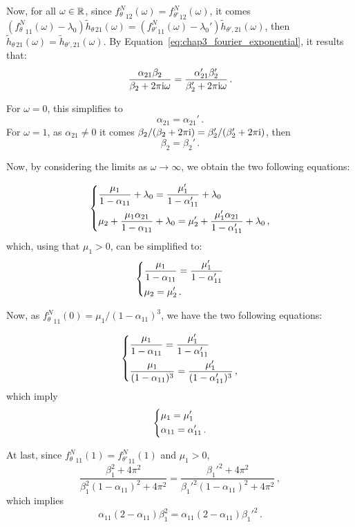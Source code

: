 \begin{subappendices}
Now, for all $\omega \in {\mathbb R}$, since ${f_\theta^N}_{12}(\omega) = {f_{\theta'}^N}_{12}(\omega)$, it comes $({f_\theta^N}_{11}(\omega) - \lambda_0)\tilde h_{\theta \, 21}(\omega) = ({f_{\theta'}^N}_{11}(\omega) - \lambda_0')\tilde h_{\theta', 21}(\omega)$, then $\tilde h_{\theta \, 21}(\omega) = \tilde h_{\theta', 21}(\omega)$.
By Equation~\eqref{eq:chap3_fourier_exponential}, it results that: 
\[
\frac{\alpha_{21} \beta_2}{\beta_2 + 2 \pi \mathrm{i} \omega} = \frac{\alpha_{21}' \beta_2'}{\beta_2' + 2 \pi \mathrm{i} \omega}\,.
\]

For $\omega = 0$, this simplifies to \[\alpha_{21} = \alpha_{21}'\,.\]
For $\omega = 1$, as $\alpha_{21} \neq 0$ it comes
${\beta_2}/(\beta_2 + 2 \pi \mathrm{i}) = {\beta_2'}/(\beta_2' + 2 \pi \mathrm{i})$, then
\[
\beta_2 = \beta_2' \,.
\]

Now, by considering the limits as $\omega \to \infty$, we obtain the two following equations:

\[\begin{dcases}
\frac{\mu_1}{1-\alpha_{11}} + \lambda_0 = \frac{\mu_1'}{1-\alpha_{11}'} + \lambda_0\\
\mu_2 + \frac{\mu_1 \alpha_{21}}{1-\alpha_{11}} + \lambda_0 = \mu_2' + \frac{\mu_1' \alpha_{21}}{1-\alpha_{11}'} + \lambda_0\,,
\end{dcases}
\]
which, using that $\mu_1 > 0$, can be simplified to:
\[
\begin{dcases}
\frac{\mu_1}{1-\alpha_{11}}= \frac{\mu_1'}{1-\alpha_{11}'}\\
\mu_2 = \mu_2'\,. 
\end{dcases}
\]

Now, as ${f_\theta^N}_{11}(0) = {\mu_1}/{(1-\alpha_{11})^3}$, we have the two following equations:

\[\begin{dcases}
\frac{\mu_1}{1-\alpha_{11}}= \frac{\mu_1'}{1-\alpha_{11}'}\\
\frac{\mu_1}{(1-\alpha_{11})^3} = \frac{\mu_1'}{(1-\alpha_{11}')^3} \,,
\end{dcases}
\]
which imply
\[
\begin{dcases}
\mu_1 = \mu_1'\\
\alpha_{11} = \alpha_{11}'\,.
\end{dcases}
\]

At last, since ${f_\theta^N}_{11}(1) = {f_{\theta'}^N}_{11}(1)$ and $\mu_1 > 0$,
\[
\frac{\beta_1^2 + 4 \pi^2}{\beta_1^2(1-\alpha_{11})^2 + 4\pi^2}
=
\frac{{\beta_1'}^2 + 4 \pi^2}{{\beta_1'}^2(1-\alpha_{11})^2 + 4\pi^2} \,,
\]
which implies
\[
\alpha_{11}(2 - \alpha_{11}) \beta_1^2
=
\alpha_{11}(2 - \alpha_{11}) {\beta_1'}^2 \,.
\]


\end{subappendices}
